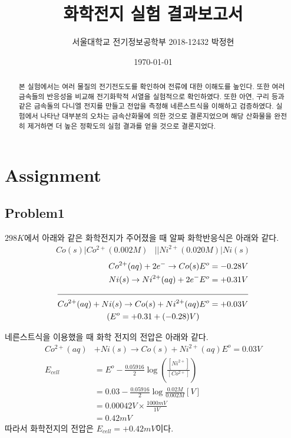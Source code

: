 \documentclass[%
 reprint,
 amsmath,amssymb,
 aps,
]{revtex4-2}
\begin{document}
\title{화학전지 실험 결과보고서}

\author{서울대학교 전기정보공학부 2018-12432 박정현}
\date{\today}%

\begin{abstract}
본 실험에서는 여러 물질의 전기전도도를 확인하여 전류에 대한 이해도를 높인다. 또한 여러 금속들의 반응성을 비교해 전기화학적 서열을 실험적으로 확인하였다. 또한 아연, 구리 등과 같은 금속돌의 다니엘 전지를 만들고 전압을  측정해 네른스트식을 이해하고 검증하였다. 실험에서 나타난 대부분의 오차는 금속산화물에 의한 것으로 결론지었으며 해당 산화물을 완전히 제거하면 더 높은 정확도의 실험 결과를 얻을 것으로 결론지었다.
\end{abstract}

\maketitle


\section{\label{sec:level1}Assignment}
\subsection{\label{sec:level2}Problem1}
$298K$에서 아래와 같은 화학전지가 주어졌을 때 알짜 화학반응식은 아래와 같다.
\begin{align}
	Co(s) | Co^{2+} (0.002M) &|| Ni^{2+} (0.020M) | Ni(s)
\end{align}
\begin{align}
	Co^{2+}(aq) + 2e^{-} \rightarrow Co(s)   &E^{o} = -0.28V\\
	Ni(s) \rightarrow Ni^{2+}(aq) + 2e^{-}    &E^{o} = +0.31V\\
	 \cline{1-2}
	Co^{2+}(aq) + Ni(s) \rightarrow Co(s) + Ni^{2+}(aq) &E^{o} = +0.03V\\
	(E^{o} = +0.31 + (-0.28)V)
\end{align}

네른스트식을 이용했을 때 화학 전지의 전압은 아래와 같다.
\begin{align}
	Co^{2+}(aq) &+ Ni(s) \rightarrow Co(s) + Ni^{2+}(aq) E^{o} = 0.03V\\
	E_{cell} &=  E^{o} - \frac{0.05916}{2}\log \left( \frac{[Ni^{2+}]}{[Co^{2+}]}\right)\\
	&= 0.03 - \frac{0.05916}{2}\log\frac{0.02M}{0.002M} [V]\\
	&= 0.00042 V \times \frac{1000mV}{1V}\\
	&= 0.42mV
\end{align}
따라서 화학전지의 전압은 $E_{cell}=+0.42mV$이다.
\end{document}
